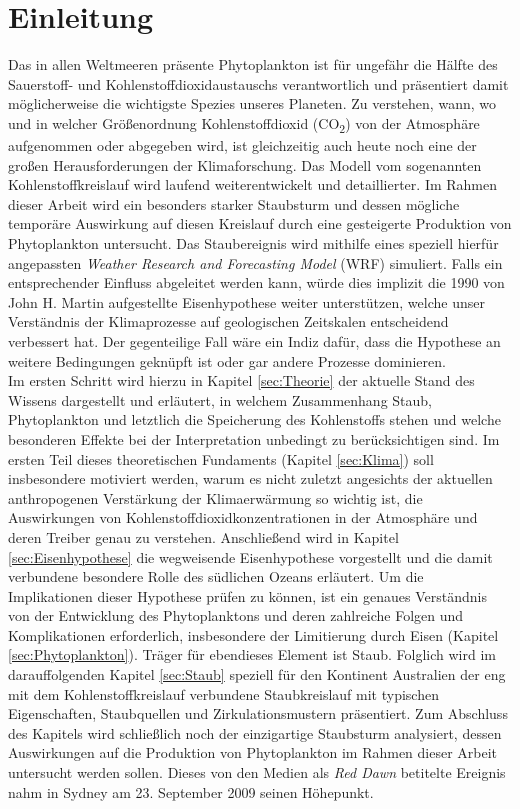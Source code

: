 \documentclass[12pt,a4paper,onecolumn,draft]{scrartcl}
\newcommand{\cotwo}{CO\textsubscript{2}}
\begin{document}
\section{Einleitung}
Das in allen Weltmeeren präsente Phytoplankton ist für ungefähr die Hälfte des Sauerstoff- und Kohlenstoffdioxidaustauschs verantwortlich \citep{Emerson.2009} und präsentiert damit möglicherweise die wichtigste Spezies unseres Planeten. Zu verstehen, wann, wo und in welcher Größenordnung Kohlenstoffdioxid (\cotwo) von der Atmosphäre aufgenommen oder abgegeben wird, ist gleichzeitig auch heute noch eine der großen Herausforderungen der Klimaforschung. Das Modell vom sogenannten Kohlenstoffkreislauf wird laufend weiterentwickelt und detaillierter. Im Rahmen dieser Arbeit wird ein besonders starker Staubsturm und dessen mögliche temporäre Auswirkung auf diesen Kreislauf durch eine gesteigerte Produktion von Phytoplankton untersucht. Das Staubereignis wird mithilfe eines speziell hierfür angepassten \textit{Weather Research and Forecasting Model} (WRF) simuliert. Falls ein entsprechender Einfluss abgeleitet werden kann, würde dies implizit die 1990 von John H. Martin aufgestellte Eisenhypothese weiter unterstützen, welche unser Verständnis der Klimaprozesse auf geologischen Zeitskalen entscheidend verbessert hat. Der gegenteilige Fall wäre ein Indiz dafür, dass die Hypothese an weitere Bedingungen geknüpft ist oder gar andere Prozesse dominieren.  \\

Im ersten Schritt wird hierzu in Kapitel \ref{sec:Theorie} der aktuelle Stand des Wissens dargestellt und erläutert, in welchem Zusammenhang Staub, Phytoplankton und letztlich die Speicherung des Kohlenstoffs stehen und welche besonderen Effekte bei der Interpretation unbedingt zu berücksichtigen sind.  Im ersten Teil dieses theoretischen Fundaments (Kapitel  \ref{sec:Klima}) soll insbesondere motiviert werden, warum es nicht zuletzt angesichts der aktuellen anthropogenen Verstärkung der Klimaerwärmung so wichtig ist, die Auswirkungen von Kohlenstoffdioxidkonzentrationen in der Atmosphäre und deren Treiber genau zu verstehen. Anschließend wird in Kapitel \ref{sec:Eisenhypothese} die wegweisende Eisenhypothese \citep{Martin.1990} vorgestellt und die damit verbundene besondere Rolle des südlichen Ozeans erläutert. Um die Implikationen dieser Hypothese prüfen zu können, ist ein genaues Verständnis von der Entwicklung des Phytoplanktons und deren zahlreiche Folgen und Komplikationen erforderlich, insbesondere der Limitierung durch Eisen  (Kapitel \ref{sec:Phytoplankton}). Träger für ebendieses Element ist Staub. Folglich wird im darauffolgenden Kapitel \ref{sec:Staub} speziell für den Kontinent Australien der eng mit dem Kohlenstoffkreislauf verbundene Staubkreislauf mit typischen Eigenschaften, Staubquellen und Zirkulationsmustern  präsentiert. Zum Abschluss des Kapitels wird schließlich noch der einzigartige Staubsturm analysiert, dessen Auswirkungen auf die Produktion von Phytoplankton im Rahmen dieser Arbeit untersucht werden sollen. Dieses von den Medien als \textit{Red Dawn} betitelte Ereignis nahm in Sydney am 23. September 2009 seinen Höhepunkt. \\
\end{document}
